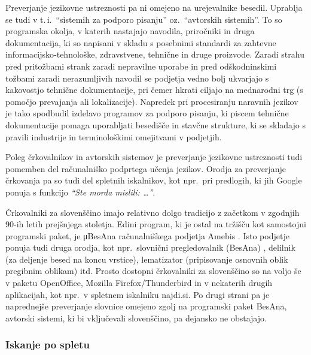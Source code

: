 \begin{multicols}{2}
Preverjanje jezikovne ustreznosti pa ni omejeno na urejevalnike besedil. Uprab\-lja se tudi v t.\,i.~“sistemih za podporo pisanju” oz.~“avtorskih sistemih”. To so programska okolja, v katerih nastajajo navodila, priročniki in druga dokumentacija, ki so napisani v skladu s posebnimi standardi za zah\-tevne informacij\-sko-tehnološke, zdravstvene, tehnične in druge proizvode. Zaradi strahu pred pritožbami strank zaradi nepravilne uporabe in pred odškodninskimi tožbami zaradi nerazumljivih navodil se podjetja vedno bolj ukvarjajo s kakovostjo tehnične dokumentacije, pri čemer hkrati ciljajo na mednarodni trg (s pomočjo prevajanja ali lokalizacije). Napredek pri procesiranju naravnih jezikov je tako spodbudil izdelavo programov za podporo pisanju, ki piscem tehnične dokumentacije pomaga uporab\-ljati besedišče in stavčne strukture, ki se skladajo s pravili industrije in terminološkimi omejitvami v podjetjih.

Poleg črkovalnikov in avtorskih sistemov je preverjanje jezikovne ustreznosti tudi pomemben del računalniško podprtega učenja jezikov. Orodja za preverjanje črkovanja pa so tudi del spletnih iskalnikov, kot npr.~pri predlogih, ki jih Google ponuja s funkcijo \textit{“Ste morda mislili: …”}.


Črkovalniki za slovenščino imajo relativno dolgo tradicijo z začetkom v zgodnjih 90-ih letih prejšnjega stoletja. Edini program, ki je ostal na tržišču kot samostojni programski paket, je μBesAna računalniškega podjetja Amebis  \cite{Amb1}. Isto podjetje ponuja tudi druga orodja, kot npr.~slovnični pregledovalnik (BesAna) \cite{Amb2}, delilnik (za deljenje besed na koncu vrstice), lematizator (pripisovanje osnovnih oblik pregibnim oblikam) itd.  Prosto dostopni črkovalniki za slovenščino so na voljo še v paketu OpenOffice, Mozilla Firefox/Thunderbird in v nekaterih drugih aplikacijah, kot npr.~v spletnem iskalniku najdi.si.\- Po drugi strani pa je naprednejše preverjanje slovnice omejeno zgolj na programski paket BesAna, avtorski sistemi, ki bi vključevali slovenščino, pa dejansko ne obstajajo.

\subsubsection{Iskanje po spletu}


\end{multicols}
